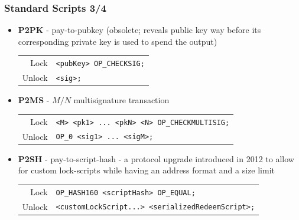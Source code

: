 \documentclass{beamer}
\begin{document}
\begin{frame}[fragile]
  \frametitle{Standard Scripts 3/4}
  \begin{itemize}
  \item \textbf{P2PK} - pay-to-pubkey (obsolete; reveals public key way before
    its corresponding private key is used to spend the output)
    \break
    \begin{tabular}{rl}
      Lock &\tiny\texttt{<pubKey> OP_CHECKSIG;} \\
      Unlock &\tiny\texttt{<sig>;} \\
    \end{tabular}
  \item \textbf{P2MS} - $M/N$ multisignature transaction
    \break
    \begin{tabular}{rl}
      Lock &\tiny\texttt{<M> <pk1> ... <pkN> <N> OP_CHECKMULTISIG;} \\
      Unlock &\tiny\texttt{OP_0 <sig1> ... <sigM>;} \\
    \end{tabular}
  \item \textbf{P2SH} - pay-to-script-hash - a protocol upgrade introduced in
    2012 to allow for custom lock-scripts while having an address format and a
    size limit
    \break
    \begin{tabular}{rl}
      Lock &\tiny\texttt{OP_HASH160 <scriptHash> OP_EQUAL;} \\
      Unlock &\tiny\texttt{<customLockScript...> <serializedRedeemScript>;} \\
    \end{tabular}
  \end{itemize}
\end{frame}
\end{document}
